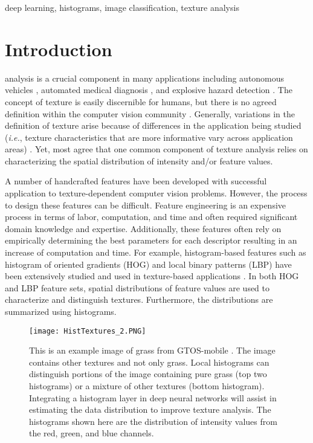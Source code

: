 \documentclass[journal]{IEEEtai}
\begin{document}
\begin{IEEEkeywords}
 deep learning, histograms, image classification, texture analysis
\end{IEEEkeywords}



\section{Introduction}

 analysis is a crucial component in many applications including autonomous vehicles \cite{curio1999walking}, automated medical diagnosis \cite{castellano2004texture}, and explosive hazard detection \cite{anderson2012combination}. The concept of texture is easily discernible for humans, but there is no agreed definition within the computer vision community \cite{tuceryan1993texture,liu2019bow}. Generally, variations in the definition of texture arise because of differences in the application being studied (\textit{i.e.}, texture characteristics that are more informative vary across application areas) \cite{tuceryan1993texture,liu2019bow}. Yet, most agree that one common component of texture analysis relies on characterizing the spatial distribution of intensity and/or feature values.  
	
A number of handcrafted features have been developed with successful application to texture-dependent computer vision problems. However, the process to design these features can be difficult. Feature engineering is an expensive process in terms of labor, computation, and time and often required significant domain knowledge and expertise. Additionally, these features often rely on empirically determining the best parameters for each descriptor resulting in an increase of computation and time.  For example, histogram-based features such as histogram of oriented gradients (HOG) \cite{dalal2005histograms} and local binary patterns (LBP) \cite{ojala2002multiresolution} have been extensively studied and used in texture-based applications \cite{lowe1999object,frigui2008detection,ojala1994performance,yang2010bag}. In both HOG and LBP feature sets, spatial distributions of feature values are used to characterize and distinguish textures.  Furthermore, the distributions are summarized using histograms. 
\begin{figure}[t]
	\begin{center}
		\texttt{[image: HistTextures\_2.PNG]}
	\end{center}
	\caption{This is an example image of grass from GTOS-mobile \cite{xue2018deep}. The image contains other textures and not only grass. Local histograms can distinguish portions of the image containing pure grass (top two histograms) or a mixture of other textures (bottom histogram). Integrating a histogram layer in deep neural networks will assist in estimating the data distribution to improve texture analysis. The histograms shown here are the distribution of intensity values from the red, green, and blue channels.}
	\label{fig:RBF_Histograms}
\end{figure} 
\end{document}
